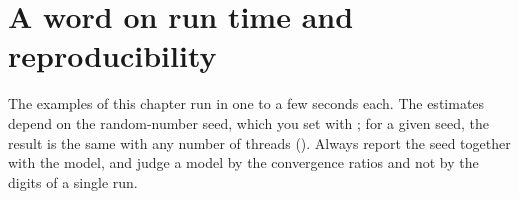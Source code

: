 \section{A word on run time and reproducibility}

The examples of this chapter run in one to a few seconds each. The estimates depend on the random-number seed, which you set with ; for a given seed, the result is the same with any number of threads (). Always report the seed together with the model, and judge a model by the convergence ratios and not by the digits of a single run.
